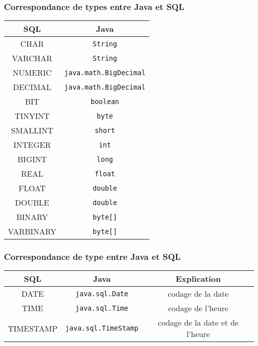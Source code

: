 \documentclass[xcolor=pdftex,x11names,table]{beamer}
\begin{document}
    \begin{frame}
    \frametitle{Correspondance de types entre Java et SQL}
    	\begin{center}
	      \begin{tabular}{c|c}
	        \hline
	        \rowcolor{couleurprincipale!80}
					SQL &       Java  \\ \hline
					CHAR&       \lstinline$String$\\
					VARCHAR& 	  \lstinline$String$\\
					NUMERIC& 	  \lstinline$java.math.BigDecimal$\\
					DECIMAL& 	  \lstinline$java.math.BigDecimal$\\
					BIT& 	      \lstinline$boolean$\\
					TINYINT& 	  \lstinline$byte$\\
					SMALLINT& 	\lstinline$short$\\
					INTEGER &	  \lstinline$int$\\
					BIGINT& 	  \lstinline$long$\\
					REAL& 	    \lstinline$float$\\
					FLOAT& 	    \lstinline$double$\\
					DOUBLE& 	  \lstinline$double$\\
					BINARY& 	  \lstinline$byte[]$\\
					VARBINARY& 	\lstinline$byte[]$\\
			        	\hline
			  \end{tabular}
	    \end{center}   
    \end{frame}

    \begin{frame}
    \frametitle{Correspondance de type entre Java et SQL}
    	\begin{center}
	      \begin{tabular}{c|c|c}
	        \hline
	        \rowcolor{couleurprincipale!80}
					SQL &      Java & Explication  \\ \hline
					DATE&      \lstinline$java.sql.Date$& 	codage de la date\\
					TIME&      \lstinline$java.sql.Time$& 	codage de l'heure\\
					TIMESTAMP& \lstinline$java.sql.TimeStamp$& 	codage de la date et de l'heure\\ \hline
			  \end{tabular}
	    \end{center}   
    \end{frame}
\end{document}
